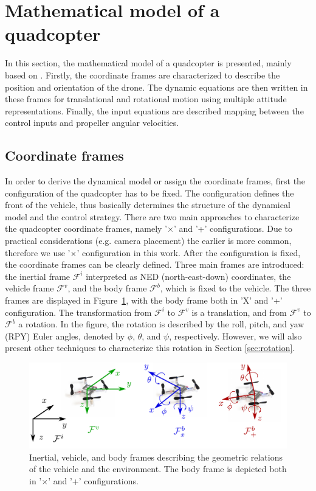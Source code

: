 \section{Mathematical model of a quadcopter}\label{sec:model}
In this section, the mathematical model of a quadcopter is presented, mainly based on \cite{quad_model}. Firstly, the coordinate frames are characterized to describe the position and orientation of the drone. The dynamic equations are then written in these frames for translational and rotational motion using multiple attitude representations. Finally, the input equations are described mapping between the control inputs and propeller angular velocities.

\subsection{Coordinate frames}\label{sec:frames}
In order to derive the dynamical model or assign the coordinate frames, first the configuration of the quadcopter has to be fixed. The configuration defines the front of the vehicle, thus basically determines the structure of the dynamical model and the control strategy. There are two main approaches to characterize the quadcopter coordinate frames, namely '$\times$' and '+' configurations. Due to practical considerations (e.g. camera placement) the earlier is more common, therefore we use '$\times$' configuration in this work. After the configuration is fixed, the coordinate frames can be clearly defined. Three main frames are introduced: the inertial frame $\mathcal{F}^i$ interpreted as NED (north-east-down) coordinates, the vehicle frame $\mathcal{F}^v$, and the body frame $\mathcal{F}^b$, which is fixed to the vehicle. The three frames are displayed in Figure~\ref{fig:frames}, with the body frame both in 'X' and '+' configuration. The transformation from $\mathcal{F}^i$ to $\mathcal{F}^v$ is a translation, and from $\mathcal{F}^v$ to $\mathcal{F}^b$ a rotation. In the figure, the rotation is described by the roll, pitch, and yaw (RPY) Euler angles, denoted by $\phi$, $\theta$, and $\psi$, respectively. However, we will also present other techniques to characterize this rotation in Section \ref{sec:rotation}.

\begin{figure}[b]
\centering 
\includegraphics[width=.75\textwidth]{Fig/xconf.pdf}
\caption[Inertial, vehicle, and body frames]{Inertial, vehicle, and body frames describing the geometric relations of the vehicle and the environment. The body frame is depicted both in '$\times$' and '+' configurations.}\label{fig:frames}
\end{figure}

